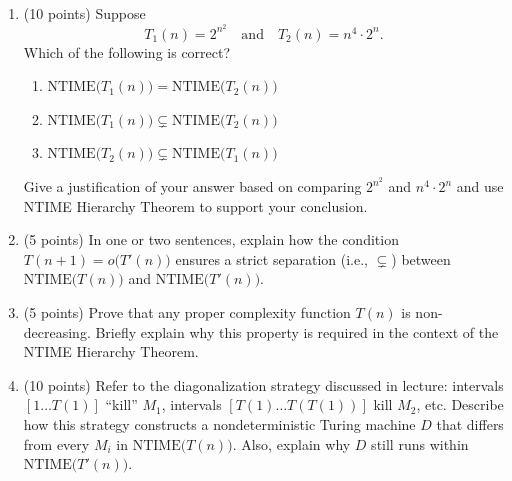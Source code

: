 \documentclass[11pt]{article}
\begin{document}
\begin{enumerate}
  \begin{enumerate}[label=(\alph*)]
  
    \item (10 points) Suppose 
    \[
      T_1(n) = 2^{n^2}
      \quad\text{and}\quad
      T_2(n) = n^4 \cdot 2^n.
    \]
    Which of the following is correct?
    \
    \begin{enumerate}[label=(\alph*)]
      \item $\text{NTIME}\bigl(T_1(n)\bigr) = \text{NTIME}\bigl(T_2(n)\bigr)$
      \item $\text{NTIME}\bigl(T_1(n)\bigr) \subsetneq \text{NTIME}\bigl(T_2(n)\bigr)$
      \item $\text{NTIME}\bigl(T_2(n)\bigr) \subsetneq \text{NTIME}\bigl(T_1(n)\bigr)$
    \end{enumerate}

    Give a justification of your answer based on comparing \(2^{n^2}\) and \(n^4 \cdot 2^n\) and use NTIME Hierarchy Theorem to support your conclusion.
    
    \begin{answer}
    \end{answer}
    
    \item (5 points) In one or two sentences, explain how the condition \(T(n+1) = o\bigl(T'(n)\bigr)\) ensures a strict separation (i.e., \(\subsetneq\)) between \(\text{NTIME}\bigl(T(n)\bigr)\) and \(\text{NTIME}\bigl(T'(n)\bigr)\).
    \\
    \begin{answer}
    \end{answer}
    
    \vspace{4mm}

    \item (5 points) Prove that any proper complexity function \( T(n) \) is non-decreasing. Briefly explain why this property is required in the context of the NTIME Hierarchy Theorem.
    
    \begin{answer}
    \end{answer}
    \vspace{4mm}
    
    
    \item (10 points) Refer to the diagonalization strategy discussed in lecture: intervals \([1 \dots T(1)]\) “kill” \(M_1\), intervals \([T(1) \dots T(T(1))]\) kill \(M_2\), etc. Describe how this strategy constructs a nondeterministic Turing machine \(D\) that differs from every \(M_i\) in \(\text{NTIME}\bigl(T(n)\bigr)\). Also, explain why \(D\) still runs within \(\text{NTIME}\bigl(T'(n)\bigr)\). 
    \\
    \begin{answer}
    \end{answer}
    
  \end{enumerate}
  
\end{enumerate}
\end{document}
